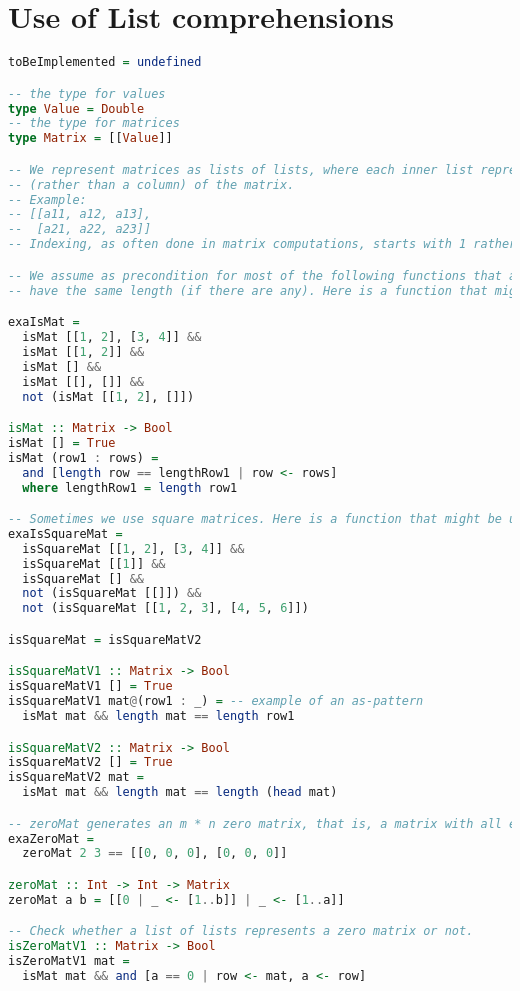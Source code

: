 \section{Use of List comprehensions}

\begin{lstlisting}[language=Haskell]
toBeImplemented = undefined

-- the type for values
type Value = Double
-- the type for matrices
type Matrix = [[Value]]

-- We represent matrices as lists of lists, where each inner list represents a row
-- (rather than a column) of the matrix.
-- Example:
-- [[a11, a12, a13],
--  [a21, a22, a23]]
-- Indexing, as often done in matrix computations, starts with 1 rather than 0 (beg Dijkstra's forgiveness).

-- We assume as precondition for most of the following functions that all inner lists
-- have the same length (if there are any). Here is a function that might be used to check this condition.

exaIsMat =
  isMat [[1, 2], [3, 4]] &&
  isMat [[1, 2]] &&
  isMat [] &&
  isMat [[], []] &&
  not (isMat [[1, 2], []])

isMat :: Matrix -> Bool
isMat [] = True
isMat (row1 : rows) =
  and [length row == lengthRow1 | row <- rows]
  where lengthRow1 = length row1

-- Sometimes we use square matrices. Here is a function that might be used to check whether a list of lists represents a square matrix.
exaIsSquareMat =
  isSquareMat [[1, 2], [3, 4]] &&
  isSquareMat [[1]] &&
  isSquareMat [] &&
  not (isSquareMat [[]]) &&
  not (isSquareMat [[1, 2, 3], [4, 5, 6]])

isSquareMat = isSquareMatV2

isSquareMatV1 :: Matrix -> Bool
isSquareMatV1 [] = True
isSquareMatV1 mat@(row1 : _) = -- example of an as-pattern
  isMat mat && length mat == length row1

isSquareMatV2 :: Matrix -> Bool
isSquareMatV2 [] = True
isSquareMatV2 mat =
  isMat mat && length mat == length (head mat)

-- zeroMat generates an m * n zero matrix, that is, a matrix with all entries 0.
exaZeroMat =
  zeroMat 2 3 == [[0, 0, 0], [0, 0, 0]]

zeroMat :: Int -> Int -> Matrix
zeroMat a b = [[0 | _ <- [1..b]] | _ <- [1..a]]

-- Check whether a list of lists represents a zero matrix or not.
isZeroMatV1 :: Matrix -> Bool
isZeroMatV1 mat =
  isMat mat && and [a == 0 | row <- mat, a <- row]


\end{lstlisting}
